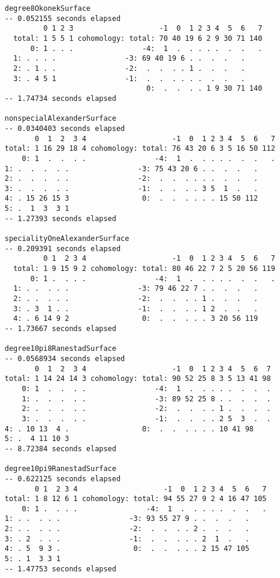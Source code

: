 \documentclass[twoside,12pt, leqno]{amsart}
\begin{document}
\begin{verbatim}
     degree8OkonekSurface
     -- 0.052155 seconds elapsed
              0 1 2 3                    -1  0  1 2 3 4  5  6   7
       total: 1 5 5 1 cohomology: total: 70 40 19 6 2 9 30 71 140
           0: 1 . . .                -4:  1  .  . . . .  .  .   .
	   1: . . . .                -3: 69 40 19 6 . .  .  .   .
	   2: . 1 . .                -2:  .  .  . . 1 .  .  .   .
	   3: . 4 5 1                -1:  .  .  . . . .  .  .   .
                                      0:  .  .  . . 1 9 30 71 140
     -- 1.74734 seconds elapsed

     nonspecialAlexanderSurface
     -- 0.0340403 seconds elapsed
            0  1  2  3 4                    -1  0  1 2 3 4  5  6   7
     total: 1 16 29 18 4 cohomology: total: 76 43 20 6 3 5 16 50 112
         0: 1  .  .  . .                -4:  1  .  . . . .  .  .   .
	 1: .  .  .  . .                -3: 75 43 20 6 . .  .  .   .
	 2: .  .  .  . .                -2:  .  .  . . . .  .  .   .
	 3: .  .  .  . .                -1:  .  .  . . 3 5  1  .   .
	 4: . 15 26 15 3                 0:  .  .  . . . . 15 50 112
	 5: .  1  3  3 1
     -- 1.27393 seconds elapsed

     specialityOneAlexanderSurface
     -- 0.209391 seconds elapsed
              0 1  2 3 4                    -1  0  1 2 3 4  5  6   7
       total: 1 9 15 9 2 cohomology: total: 80 46 22 7 2 5 20 56 119
           0: 1 .  . . .                -4:  1  .  . . . .  .  .   .
	   1: . .  . . .                -3: 79 46 22 7 . .  .  .   .
	   2: . .  . . .                -2:  .  .  . . 1 .  .  .   .
	   3: . 3  1 . .                -1:  .  .  . . 1 2  .  .   .
	   4: . 6 14 9 2                 0:  .  .  . . . 3 20 56 119
     -- 1.73667 seconds elapsed

     degree10pi8RanestadSurface
     -- 0.0568934 seconds elapsed
            0  1  2  3 4                    -1  0  1 2 3 4  5  6  7
     total: 1 14 24 14 3 cohomology: total: 90 52 25 8 3 5 13 41 98
         0: 1  .  .  . .                -4:  1  .  . . . .  .  .  .
         1: .  .  .  . .                -3: 89 52 25 8 . .  .  .  .
         2: .  .  .  . .                -2:  .  .  . . 1 .  .  .  .
         3: .  .  .  . .                -1:  .  .  . . 2 5  3  .  .
	 4: . 10 13  4 .                 0:  .  .  . . . . 10 41 98
	 5: .  4 11 10 3
     -- 8.72384 seconds elapsed

     degree10pi9RanestadSurface
     -- 0.622125 seconds elapsed
            0 1  2 3 4                    -1  0  1 2 3 4  5  6   7
     total: 1 8 12 6 1 cohomology: total: 94 55 27 9 2 4 16 47 105
         0: 1 .  . . .                -4:  1  .  . . . .  .  .   .
	 1: . .  . . .                -3: 93 55 27 9 . .  .  .   .
	 2: . .  . . .                -2:  .  .  . . 2 .  .  .   .
	 3: . 2  . . .                -1:  .  .  . . . 2  1  .   .
	 4: . 5  9 3 .                 0:  .  .  . . . 2 15 47 105
	 5: . 1  3 3 1
     -- 1.47753 seconds elapsed


\end{verbatim}
\end{document}
